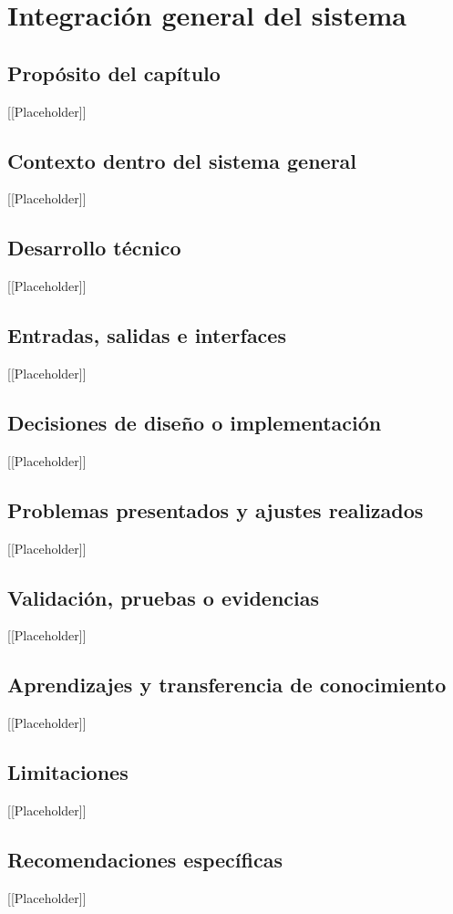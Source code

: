 \chapter{Integración general del sistema}

\section{Propósito del capítulo}
[[Placeholder]]

\section{Contexto dentro del sistema general}
[[Placeholder]]

\section{Desarrollo técnico}
[[Placeholder]]

\section{Entradas, salidas e interfaces}
[[Placeholder]]

\section{Decisiones de diseño o implementación}
[[Placeholder]]

\section{Problemas presentados y ajustes realizados}
[[Placeholder]]

\section{Validación, pruebas o evidencias}
[[Placeholder]]

\section{Aprendizajes y transferencia de conocimiento}
[[Placeholder]]

\section{Limitaciones}
[[Placeholder]]

\section{Recomendaciones específicas}
[[Placeholder]]
